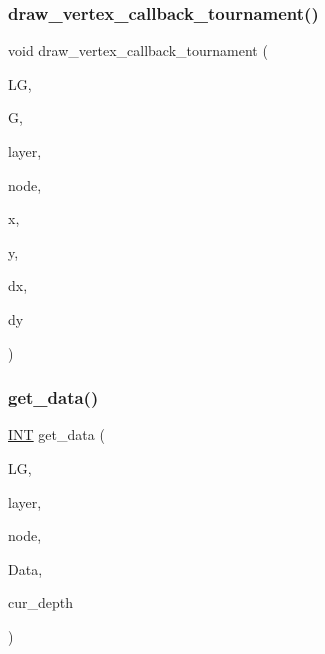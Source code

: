 \subsubsection{\texorpdfstring{draw\+\_\+vertex\+\_\+callback\+\_\+tournament()}{draw\_vertex\_callback\_tournament()}}
{\footnotesize\ttfamily void draw\+\_\+vertex\+\_\+callback\+\_\+tournament (\begin{DoxyParamCaption}\item[{\mbox{\hyperlink{classlayered__graph}{layered\+\_\+graph}} $\ast$}]{LG,  }\item[{\mbox{\hyperlink{classmp__graphics}{mp\+\_\+graphics}} $\ast$}]{G,  }\item[{\mbox{\hyperlink{galois_8h_a09fddde158a3a20bd2dcadb609de11dc}{I\+NT}}}]{layer,  }\item[{\mbox{\hyperlink{galois_8h_a09fddde158a3a20bd2dcadb609de11dc}{I\+NT}}}]{node,  }\item[{\mbox{\hyperlink{galois_8h_a09fddde158a3a20bd2dcadb609de11dc}{I\+NT}}}]{x,  }\item[{\mbox{\hyperlink{galois_8h_a09fddde158a3a20bd2dcadb609de11dc}{I\+NT}}}]{y,  }\item[{\mbox{\hyperlink{galois_8h_a09fddde158a3a20bd2dcadb609de11dc}{I\+NT}}}]{dx,  }\item[{\mbox{\hyperlink{galois_8h_a09fddde158a3a20bd2dcadb609de11dc}{I\+NT}}}]{dy }\end{DoxyParamCaption})}

\mbox{\label{layered__graph__main_8_c_a46c02d73e6db0b9ff657c60be0288215}} 
\subsubsection{\texorpdfstring{get\+\_\+data()}{get\_data()}}
{\footnotesize\ttfamily \mbox{\hyperlink{galois_8h_a09fddde158a3a20bd2dcadb609de11dc}{I\+NT}} get\+\_\+data (\begin{DoxyParamCaption}\item[{\mbox{\hyperlink{classlayered__graph}{layered\+\_\+graph}} $\ast$}]{LG,  }\item[{\mbox{\hyperlink{galois_8h_a09fddde158a3a20bd2dcadb609de11dc}{I\+NT}}}]{layer,  }\item[{\mbox{\hyperlink{galois_8h_a09fddde158a3a20bd2dcadb609de11dc}{I\+NT}}}]{node,  }\item[{\mbox{\hyperlink{galois_8h_a09fddde158a3a20bd2dcadb609de11dc}{I\+NT}} $\ast$}]{Data,  }\item[{\mbox{\hyperlink{galois_8h_a09fddde158a3a20bd2dcadb609de11dc}{I\+NT}}}]{cur\+\_\+depth }\end{DoxyParamCaption})}


